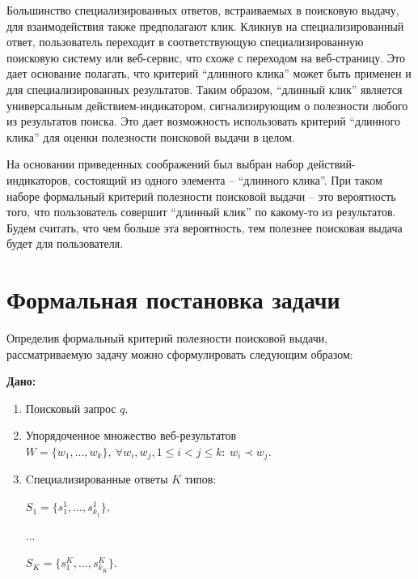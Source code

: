 \documentclass[12pt,a4paper]{report}
\newcommand\note[1]{\textcolor{red}{(#1)}}
\newcommand\todonote[1]{\note{TODO: #1}}
\begin{document}

Большинство специализированных ответов, встраиваемых в поисковую выдачу, для взаимодействия также предполагают клик. Кликнув на специализированный ответ, пользователь переходит в соответствующую специализированную поисковую систему или веб-сервис, что схоже с переходом на веб-страницу. Это дает основание полагать, что критерий ``длинного клика'' может быть применен и для специализированных результатов. Таким образом, ``длинный клик'' является универсальным действием-индикатором, сигнализирующим о полезности любого из результатов поиска. Это дает возможность использовать критерий ``длинного клика'' для оценки полезности поисковой выдачи в целом.


На основании приведенных соображений был выбран набор действий-индикаторов, состоящий из одного элемента -- ``длинного клика''. При таком наборе формальный критерий полезности поисковой выдачи -- это вероятность того, что пользователь совершит ``длинный клик'' по какому-то из результатов. Будем считать, что чем больше эта вероятность, тем полезнее поисковая выдача будет для пользователя. 

\section{Формальная постановка задачи}
\label{sec:task-formal}

Определив формальный критерий полезности поисковой выдачи, рассматриваемую задачу можно сформулировать следующим образом:
\vspace{3mm}

\textbf{Дано:} 
\begin{enumerate}
\item Поисковый запрос $q$. 
\item Упорядоченное множество веб-результатов $W=\{w_1, ..., w_k\}, \ \forall w_i, w_j, 1 \le i < j \le k: \ w_i \prec w_j$.
\item Cпециализированные ответы $K$ типов: \par
$S_1=\{s^{1}_{1}, ..., s^{1}_{k_1}\},$ \par
$...$ \par
$S_K=\{s^{K}_{1}, ..., s^{K}_{k_K}\}$.
\end{enumerate}
\end{document}
